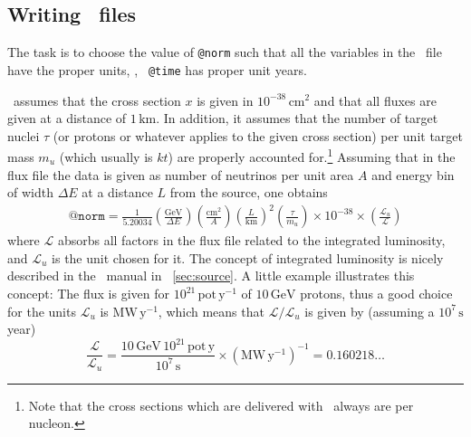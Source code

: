 \begin{appendix}
\section*{Writing \AEDL\ files}

The task is to choose the value of  {\tt @norm} such that all the
variables in the \AEDL\ file have the proper units, \eg , {\tt
  @time} has proper unit years.

\GLOBES\ assumes that the cross
section $x$ is given in $10^{-38}\,\mathrm{cm}^2$ and that all fluxes are
given at a distance of $1\,\mathrm{km}$. In addition, it assumes that
the number of target nuclei $\tau$ (or protons or whatever applies to the
given cross section) per unit target mass $m_u$ (which usually is $kt$)
 are properly accounted for.\footnote{Note that the cross sections which are delivered with
  \GLOBES\ always are per nucleon.}  Assuming that in the flux file
the data is given as number of neutrinos per unit area $A$ and
energy bin of width $\Delta E$ at a distance $L$ from the source, one
obtains
\begin{eqnarray}
\mathtt{@norm}=\frac{1}{5.20034}\left(\frac{\mathrm{GeV}}{\Delta
      E}\right)
\left(\frac{\mathrm{cm}^2}{A}\right)\left(\frac{L}{\mathrm{km}}\right)^2\left(\frac{\tau}{m_u}\right)\times10^{-38}\times\left(\frac{\mathcal{L}_u}{\mathcal{L}}\right)
\end{eqnarray}
where $\mathcal{L}$ absorbs all factors in the flux file related to
the integrated luminosity, and $\mathcal{L}_u$ is the unit chosen for
it.  The concept of integrated luminosity is
nicely described in the \GLOBES\ manual in \Sec~\ref{sec:source}.
A little example illustrates this concept:
The flux is given for $10^{21}\, \mathrm{pot}\,\mathrm{y}^{-1}$ of
$10\,\mathrm{GeV}$ protons, thus a good choice for the units $\mathcal{L}_u$
is $\mathrm{MW}\,\mathrm{y}^{-1}$, which means that
$\mathcal{L}/\mathcal{L}_u$ is given by (assuming a $10^7\,\mathrm{s}$
year)
\begin{equation}
\frac{\mathcal{L}}{\mathcal{L}_u}=\frac{10\,\mathrm{GeV}\,10^{21}\,\mathrm{pot}\,\mathrm{y}}{10^7\,\mathrm{s}}\times(\mathrm{MW}\,\mathrm{y}^{-1})^{-1}=0.160218\ldots
\end{equation}


{\footnotesize



}


\end{appendix}

